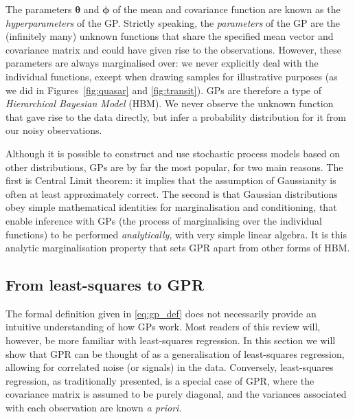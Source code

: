 \documentclass[letterpaper]{ar-1col}
\newcommand{\hyperparams}{\ensuremath{\boldsymbol{\phi}}}
\newcommand{\meanparams}{\ensuremath{\boldsymbol{\theta}}}
\begin{document}
The parameters $\meanparams$ and $\hyperparams$ of the mean and covariance function are known as the \textit{hyperparameters} of the GP. Strictly speaking, the \textit{parameters} of the GP are the (infinitely many) unknown functions that share the specified mean vector and covariance matrix and could have given rise to the observations. However, these parameters are always marginalised over: we never explicitly deal with the individual functions, except when drawing samples for illustrative purposes (as we did in Figures~\ref{fig:quasar} and \ref{fig:transit}). GPs are therefore a type of \textit{Hierarchical Bayesian Model} (HBM). 
We never observe the unknown function that gave rise to the data directly, but infer a probability distribution for it from our noisy observations.

Although it is possible to construct and use stochastic process models based on other distributions, GPs are by far the most popular, for two main reasons. The first is Central Limit theorem: it implies that the assumption of Gaussianity is often at least approximately correct. The second is that Gaussian distributions obey simple mathematical identities for marginalisation and conditioning, that enable inference with GPs (the process of marginalising over the individual functions) to be performed \textit{analytically}, with very simple linear algebra. It is this analytic marginalisation property that sets GPR apart from other forms of HBM. 

\subsection{From least-squares to GPR}
\label{sec:from_lsq}

The formal definition given in \autoref{eq:gp_def} does not necessarily provide an intuitive understanding of how GPs work. Most readers of this review will, however, be more familiar with least-squares regression. In this section we will show that GPR can be thought of as a generalisation of least-squares regression, allowing for correlated noise (or signals) in the data. Conversely, least-squares regression, as traditionally presented, is a special case of GPR, where the covariance matrix is assumed to be purely diagonal, and the variances associated with each observation are known \textit{a priori}.
\end{document}
